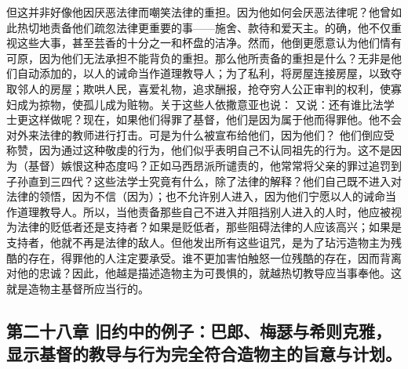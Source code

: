 但这并非好像他因厌恶法律而嘲笑法律的重担。因为他如何会厌恶法律呢？他曾如此热切地责备他们疏忽法律更重要的事——施舍、款待和爱天主。的确，他不仅重视这些大事，甚至芸香的十分之一和杯盘的洁净。然而，他倒更愿意认为他们情有可原，因为他们无法承担不能背负的重担。那么他所责备的重担是什么？无非是他们自动添加的，以人的诫命当作道理教导人；为了私利，将房屋连接房屋，以致夺取邻人的房屋；欺哄人民，喜爱礼物，追求酬报，抢夺穷人公正审判的权利，使寡妇成为掠物，使孤儿成为赃物。关于这些人依撒意亚也说： 又说：还有谁比法学士更这样做呢？现在，如果他们得罪了基督，他们是因为属于他而得罪他。他不会对外来法律的教师进行打击。可是为什么被宣布给他们，因为他们？ 他们倒应受称赞，因为通过这种敬虔的行为，他们似乎表明自己不认同祖先的行为。这不是因为（基督）嫉恨这种态度吗？正如马西昂派所谴责的，他常常将父亲的罪过追罚到子孙直到三四代？这些法学士究竟有什么，除了法律的解释？他们自己既不进入对法律的领悟，因为不信（因为）；也不允许别人进入，因为他们宁愿以人的诫命当作道理教导人。所以，当他责备那些自己不进入并阻挡别人进入的人时，他应被视为法律的贬低者还是支持者？如果是贬低者，那些阻碍法律的人应该高兴；如果是支持者，他就不再是法律的敌人。但他发出所有这些诅咒，是为了玷污造物主为残酷的存在，得罪他的人注定要承受。谁不更加害怕触怒一位残酷的存在，因而背离对他的忠诚？因此，他越是描述造物主为可畏惧的，就越热切教导应当事奉他。这就是造物主基督所应当行的。\par


\subsection{第二十八章 旧约中的例子：巴郎、梅瑟与希则克雅，显示基督的教导与行为完全符合造物主的旨意与计划。}

